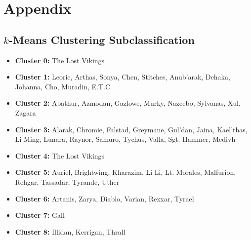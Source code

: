\documentclass[11pt,letterpaper]{article}
\begin{document}
\section*{Appendix}

\subsection*{$k$-Means Clustering Subclassification}

\begin{itemize}
\item \textbf{Cluster 0:} The Lost Vikings
\item \textbf{Cluster 1:} Leoric, Arthas, Sonya, Chen, Stitches, Anub'arak, Dehaka, Johanna, Cho, Muradin, E.T.C 
\item \textbf{Cluster 2:} Abathur, Azmodan, Gazlowe, Murky, Nazeebo, Sylvanas, Xul, Zagara
\item \textbf{Cluster 3:} Alarak, Chromie, Falstad, Greymane, Gul'dan, Jaina, Kael'thas, Li-Ming, Lunara, Raynor, Samuro, Tychus, Valla, Sgt. Hammer, Medivh
\item \textbf{Cluster 4:} The Lost Vikings
\item \textbf{Cluster 5:} Auriel, Brightwing, Kharazim, Li Li, Lt. Morales, Malfurion, Rehgar, Tassadar, Tyrande, Uther
\item \textbf{Cluster 6:} Artanis, Zarya, Diablo, Varian, Rexxar, Tyrael
\item \textbf{Cluster 7:} Gall
\item \textbf{Cluster 8:} Illidan, Kerrigan, Thrall
\end{itemize}
\end{document}
